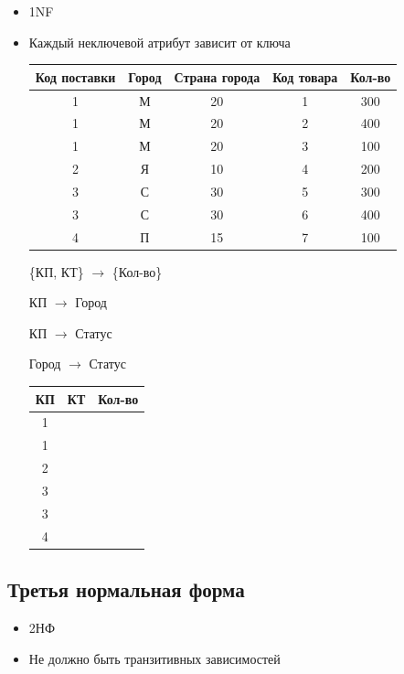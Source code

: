 \documentclass[a4paper, 14pt]{report}
\begin{document}
\begin{itemize}
    \item 1NF
    \item Каждый неключевой атрибут зависит от ключа

        \begin{tabular}{|c|c|c|c|c|}
            \hline
            Код поставки & Город & Страна города & Код товара & Кол-во \\
            \hline
            1 & М & 20 & 1 & 300 \\
            1 & М & 20 & 2 & 400 \\
            1 & М & 20 & 3 & 100 \\
            2 & Я & 10 & 4 & 200 \\
            3 & С & 30 & 5 & 300 \\
            3 & С & 30 & 6 & 400 \\
            4 & П & 15 & 7 & 100 \\
            \hline
        \end{tabular}

        \{КП, КТ\} $\to$ \{Кол-во\}

        КП $\to$ Город

        КП $\to$ Статус

        Город $\to$ Статус

        \begin{table}[H]
            \centering
            \begin{tabular}{|c|c|c|}
                \hline
                КП & КТ & Кол-во \\
                \hline
                1 & & \\
                1 & & \\
                2 & & \\
                3 & & \\
                3 & & \\
                4 & & \\
                \hline
            \end{tabular}
        \end{table}
        \end{itemize}

\subsection{Третья нормальная форма}

\begin{itemize}
    \item 2НФ
    \item Не должно быть транзитивных зависимостей
\end{itemize}
\end{document}
